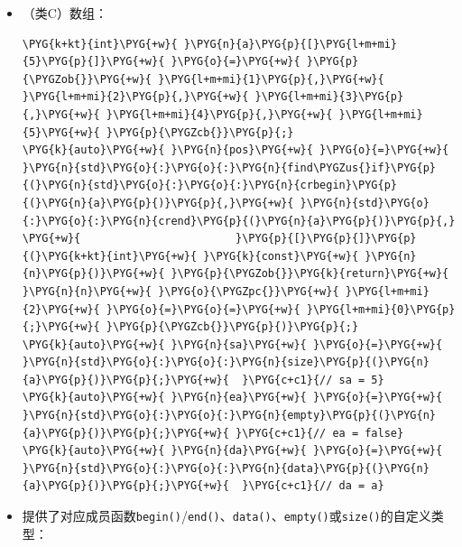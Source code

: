 \begin{itemize}

\item （类C）数组：



\begin{codeblockbg}
\begin{Verbatim}[commandchars=\\\{\},breaklines=true,breakanywhere=true,fontsize=\codefont,xleftmargin=17bp]
\PYG{k+kt}{int}\PYG{+w}{ }\PYG{n}{a}\PYG{p}{[}\PYG{l+m+mi}{5}\PYG{p}{]}\PYG{+w}{ }\PYG{o}{=}\PYG{+w}{ }\PYG{p}{\PYGZob{}}\PYG{+w}{ }\PYG{l+m+mi}{1}\PYG{p}{,}\PYG{+w}{ }\PYG{l+m+mi}{2}\PYG{p}{,}\PYG{+w}{ }\PYG{l+m+mi}{3}\PYG{p}{,}\PYG{+w}{ }\PYG{l+m+mi}{4}\PYG{p}{,}\PYG{+w}{ }\PYG{l+m+mi}{5}\PYG{+w}{ }\PYG{p}{\PYGZcb{}}\PYG{p}{;}
\PYG{k}{auto}\PYG{+w}{ }\PYG{n}{pos}\PYG{+w}{ }\PYG{o}{=}\PYG{+w}{ }\PYG{n}{std}\PYG{o}{:}\PYG{o}{:}\PYG{n}{find\PYGZus{}if}\PYG{p}{(}\PYG{n}{std}\PYG{o}{:}\PYG{o}{:}\PYG{n}{crbegin}\PYG{p}{(}\PYG{n}{a}\PYG{p}{)}\PYG{p}{,}\PYG{+w}{ }\PYG{n}{std}\PYG{o}{:}\PYG{o}{:}\PYG{n}{crend}\PYG{p}{(}\PYG{n}{a}\PYG{p}{)}\PYG{p}{,}
\PYG{+w}{                        }\PYG{p}{[}\PYG{p}{]}\PYG{p}{(}\PYG{k+kt}{int}\PYG{+w}{ }\PYG{k}{const}\PYG{+w}{ }\PYG{n}{n}\PYG{p}{)}\PYG{+w}{ }\PYG{p}{\PYGZob{}}\PYG{k}{return}\PYG{+w}{ }\PYG{n}{n}\PYG{+w}{ }\PYG{o}{\PYGZpc{}}\PYG{+w}{ }\PYG{l+m+mi}{2}\PYG{+w}{ }\PYG{o}{=}\PYG{o}{=}\PYG{+w}{ }\PYG{l+m+mi}{0}\PYG{p}{;}\PYG{+w}{ }\PYG{p}{\PYGZcb{}}\PYG{p}{)}\PYG{p}{;}
\PYG{k}{auto}\PYG{+w}{ }\PYG{n}{sa}\PYG{+w}{ }\PYG{o}{=}\PYG{+w}{ }\PYG{n}{std}\PYG{o}{:}\PYG{o}{:}\PYG{n}{size}\PYG{p}{(}\PYG{n}{a}\PYG{p}{)}\PYG{p}{;}\PYG{+w}{  }\PYG{c+c1}{// sa = 5}
\PYG{k}{auto}\PYG{+w}{ }\PYG{n}{ea}\PYG{+w}{ }\PYG{o}{=}\PYG{+w}{ }\PYG{n}{std}\PYG{o}{:}\PYG{o}{:}\PYG{n}{empty}\PYG{p}{(}\PYG{n}{a}\PYG{p}{)}\PYG{p}{;}\PYG{+w}{ }\PYG{c+c1}{// ea = false}
\PYG{k}{auto}\PYG{+w}{ }\PYG{n}{da}\PYG{+w}{ }\PYG{o}{=}\PYG{+w}{ }\PYG{n}{std}\PYG{o}{:}\PYG{o}{:}\PYG{n}{data}\PYG{p}{(}\PYG{n}{a}\PYG{p}{)}\PYG{p}{;}\PYG{+w}{  }\PYG{c+c1}{// da = a}
\end{Verbatim}
\end{codeblockbg}



\item 提供了对应成员函数\texttt{begin()}/\texttt{end()}、\texttt{data()}、\texttt{empty()}或\texttt{size()}的自定义类型：




\end{itemize}
